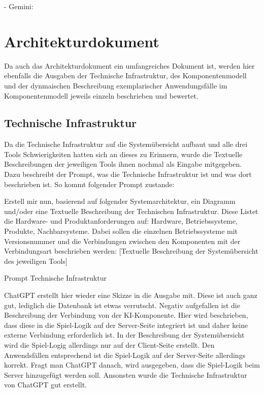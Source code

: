 - Gemini:


\section{Architekturdokument}  \label{CompArchitekturdokument}

Da auch das Architekturdokument ein umfangreiches Dokument ist, werden hier ebenfalls die Ausgaben der Technische Infrastruktur, des Komponentenmodell 
und der dynmaischen Beschreibung exemplarischer Anwendungsfälle im Komponentenmodell jeweils einzeln beschrieben und bewertet.

\subsection*{Technische Infrastruktur}

Da die Technische Infrastruktur auf die Systemübersicht aufbaut und alle drei Tools Schwierigkeiten hatten sich an dieses zu Erinnern, wurde die Textuelle 
Beschreibungen der jeweiligen Tools ihnen nochmal als Eingabe mitgegeben. Dazu beschreibt der Prompt, was die Technische Infrastruktur ist und was dort 
beschrieben ist. So kommt folgender Prompt zustande:

\begin{prompt}[H]
    \begin{tcolorbox}[colback=gray!20, colframe=gray!20, boxrule=0pt, sharp corners] 
        Erstell mir nun, basierend auf folgender Systemarchitektur, ein Diagramm und/oder eine Textuelle Beschreibung der Technischen Infrastruktur. 
        Diese Listet die Hardware- und Produktanforderungen auf: Hardware, Betriebssysteme, Produkte, Nachbarsysteme. Dabei sollen die einzelnen 
        Betriebssysteme mit Versionsnummer und die Verbindungen zwischen den Komponenten mit der Verbindungsart beschrieben werden: [Textuelle 
        Beschreibung der Systemübersicht des jeweiligen Tools]
        \vfill
    \end{tcolorbox}
    \caption{Prompt Technische Infrastruktur}
    \label{Prompt Technische Infrastruktur}
\end{prompt}

ChatGPT erstellt hier wieder eine Skizze in die Ausgabe mit. Diese ist auch ganz gut, lediglich die Datenbank ist etwas verrutscht. Negativ aufgefallen
ist die Beschreibung der Verbindung von der KI-Komponente. Hier wird beschrieben, dass diese in die Spiel-Logik auf der Server-Seite integriert ist und 
daher keine externe Verbindung erforderlich ist. In der Beschreibung der Systemübersicht wird die Spiel-Logig allerdings nur auf der Client-Seite erstellt.
Den Anwendsfällen entsprechend ist die Spiel-Logik auf der Server-Seite allerdings korrekt. Fragt man ChatGPT danach, wird ausgegeben, dass die Spiel-Logik 
beim Server hinzugefügt werden soll. Ansonsten wurde die Technische Infrastruktur von ChatGPT gut erstellt.\\

